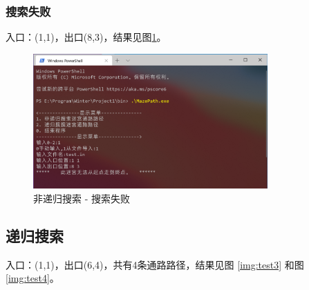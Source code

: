 \documentclass{ctexart}
\begin{document}
    \subsubsection{搜索失败}

    入口：(1,1)，出口(8,3)，结果见图\ref{img:test2}。

    \begin{figure}[h]
        \centering
        \includegraphics[width=0.8\textwidth]{测试结果6.png}
        \caption{非递归搜索 - 搜索失败}
        \label{img:test2}
    \end{figure}


    \subsection{递归搜索}

    入口：(1,1)，出口(6,4)，共有4条通路路径，结果见图 \ref{img:test3} 和图 \ref{img:test4}。
\end{document}

